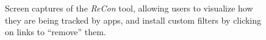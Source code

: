 \begin{figure}[tb]
\hspace{0.1in}
{}
\caption{Screen captures of the \emph{ReCon} tool, allowing users to visualize how they are being tracked by apps, and install custom filters by clicking on links to ``remove'' them. }
\label{fig:recon}
\vspace{\postfigspace}
\end{figure}

